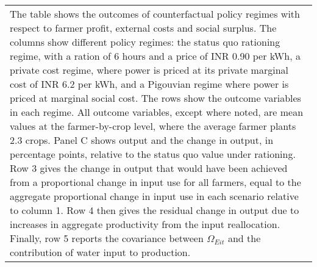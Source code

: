 \begin{table}[!ht]
\begin{tabular}{lrrrrr}
\multicolumn{6}{p{0.85\hsize}}{\footnotesize The table shows the outcomes of counterfactual policy regimes with respect to farmer profit, external costs and social surplus. The columns show different policy regimes: the status quo rationing regime, with a ration of 6 hours and a price of INR 0.90 per kWh, a private cost regime, where power is priced at its private marginal cost of INR 6.2 per kWh, and a Pigouvian regime where power is priced at marginal social cost. The rows show the outcome variables in each regime. All outcome variables, except where noted, are mean values at the farmer-by-crop level, where the average farmer plants 2.3 crops. Panel C shows output and the change in output, in percentage points, relative to the status quo value under rationing. Row 3 gives the change in output that would have been achieved from a proportional change in input use for all farmers, equal to the aggregate proportional change in input use in each scenario relative to column 1. Row 4 then gives the residual change in output due to increases in aggregate productivity from the input reallocation. Finally, row 5 reports the covariance between $\Omega_{Eit}$ and the contribution of water input to production.} \\
	\end{tabular}
\end{table}
